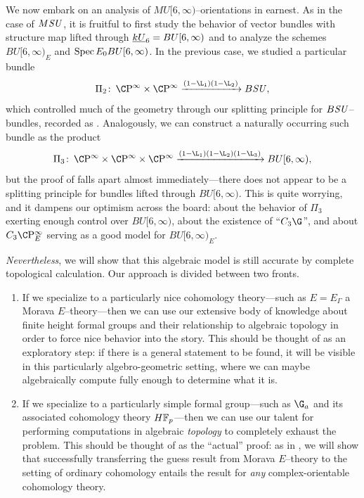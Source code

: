 We now embark on an analysis of \(MU[6, \infty)\)--orientations in earnest.
As in the case of \(M\mathit{SU}\), it is fruitful to first study the behavior of vector bundles with structure map lifted through \(\OS{kU}{6} = BU[6, \infty)\) and to analyze the schemes \(BU[6, \infty)_E\) and \(\operatorname{Spec} E_0 BU[6, \infty)\).
In the previous case, we studied a particular bundle \[\Pi_2\co \CP^\infty \times \CP^\infty \xrightarrow{(1 - \L_1)(1 - \L_2)} B\SU,\] which controlled much of the geometry through our splitting principle for \(B\mathit{SU}\)--bundles, recorded as .
Analogously, we can construct a naturally occurring such bundle as the product \[\Pi_3\co \CP^\infty \times \CP^\infty \times \CP^\infty \xrightarrow{(1 - \L_1)(1 - \L_2)(1 - \L_3)} BU[6, \infty),\] but the proof of  falls apart almost immediately---there does not appear to be a splitting principle for bundles lifted through \(BU[6, \infty)\).
This is quite worrying, and it dampens our optimism across the board: about the behavior of \(\Pi_3\) exerting enough control over \(BU[6, \infty)\), about the existence of ``\(C_3 \G\)'', and about \(C_3 \CP^\infty_E\) serving as a good model for \(BU[6, \infty)_E\).

\emph{Nevertheless}, we will show that this algebraic model is still accurate by complete topological calculation.
Our approach is divided between two fronts.
\begin{enumerate}
    \item If we specialize to a particularly nice cohomology theory---such as \(E = E_\Gamma\) a Morava \(E\)--theory---then we can use our extensive body of knowledge about finite height formal groups and their relationship to algebraic topology in order to force nice behavior into the story.
          This should be thought of as an exploratory step: if there is a general statement to be found, it will be visible in this particularly algebro-geometric setting, where we can maybe algebraically compute fully enough to determine what it is.
    \item If we specialize to a particularly simple formal group---such as \(\G_a\) and its associated cohomology theory \(\HFp\)---then we can use our talent for performing computations in algebraic \emph{topology} to completely exhaust the problem.
          This should be thought of as the ``actual'' proof: as in , we will show that successfully transferring the guess result from Morava \(E\)--theory to the setting of ordinary cohomology entails the result for \emph{any} complex-orientable cohomology theory.
\end{enumerate}

